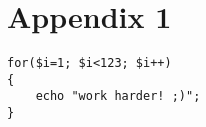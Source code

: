 \chapter{Appendix 1}
\label{appendix:listing1}

\lstset{language=PHP}
\begin{lstlisting}
for($i=1; $i<123; $i++)
{
    echo "work harder! ;)";
}
\end{lstlisting}